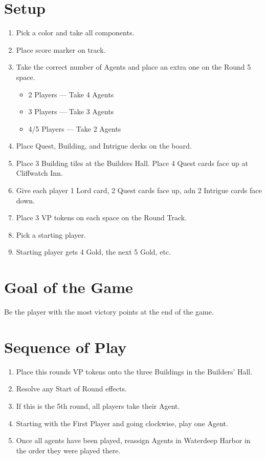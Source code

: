 \documentclass[12pt]{article}
\newenvironment{enumerateCustom}
{\begin{enumerate}
  \setlength{\itemsep}{1pt}
  \setlength{\parskip}{0pt}
  \setlength{\parsep}{0pt}}
{\end{enumerate}}
\newenvironment{itemizeCustom}
{\begin{itemize}
  \setlength{\itemsep}{1pt}
  \setlength{\parskip}{0pt}
  \setlength{\parsep}{0pt}}
{\end{itemize}}
\begin{document}
\begin{mdframed}[style = customFrame]
\begin{multicols*}{2}

\section*{Setup}
\begin{enumerateCustom}
	\item Pick a color and take all components. 
	\item Place score marker on track.
	\item Take the correct number of Agents and place an extra one on the Round 5 space.
		\begin{itemizeCustom}
			\item 2 Players --- Take 4 Agents
			\item 3 Players --- Take 3 Agents
			\item 4/5 Players --- Take 2 Agents
		\end{itemizeCustom}
	\item Place Quest, Building, and Intrigue decks on the board.
	\item Place 3 Building tiles at the Builders Hall. Place 4 Quest cards face up at Cliffwatch Inn.
	\item Give each player 1 Lord card, 2 Quest cards face up, adn 2 Intrigue cards face down.
	\item Place 3 VP tokens on each space on the Round Track.
	\item Pick a starting player.
	\item Starting player gets 4 Gold, the next 5 Gold, etc.
\end{enumerateCustom}

\section*{Goal of the Game}
Be the player with the most victory points at the end of the game.

\section*{Sequence of Play}
\begin{enumerateCustom}
	\item Place this rounds VP tokens onto the three Buildings in the Builders' Hall.
	\item Resolve any Start of Round effects.
	\item If this is the 5th round, all players take their Agent.
	\item Starting with the First Player and going clockwise, play one Agent.
	\item Once all agents have been played, reassign Agents in Waterdeep Harbor in the order they were played there.
\end{enumerateCustom}


\end{multicols*}
\end{mdframed}
\end{document}
